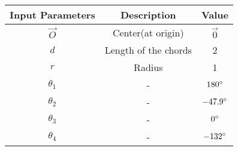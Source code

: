     \begin{tabular}{|c|c|c|}
    \hline
    \textbf{Input Parameters} &\textbf{Description} &\textbf{Value} \\
    \hline
     $\vec{O}$& Center(at origin)&$\vec{0}$\\
     \hline
$d$&Length of the chords &2\\
 \hline
 $r$ & Radius &1\\
 \hline
 $\theta_1$&-&$180\degree$\\
 \hline
 $\theta_2$&-&$-47.9\degree$\\
 \hline
 $\theta_3$&-&$0\degree$\\
 \hline
 $\theta_4$&-&$-132\degree$\\
 \hline
 
    \end{tabular}
